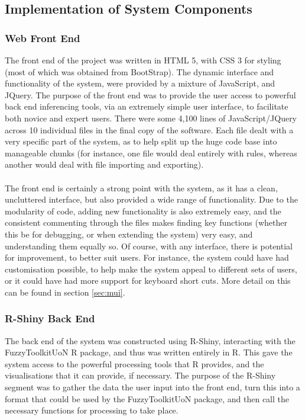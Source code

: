 \subsection{Implementation of System Components}
\tocless\subsubsection{Web Front End}
The front end of the project was written in HTML 5, with CSS 3 for styling (most of which was obtained from BootStrap). The dynamic interface and functionality of the system, were provided by a mixture of JavaScript, and JQuery. The purpose of the front end was to provide the user access to powerful back end inferencing tools, via an extremely simple user interface, to facilitate both novice and expert users. There were some 4,100 lines of JavaScript/JQuery across 10 individual files in the final copy of the software. Each file dealt with a very specific part of the system, as to help split up the huge code base into manageable chunks (for instance, one file would deal entirely with rules, whereas another would deal with file importing and exporting).\ \\
\ \\
The front end is certainly a strong point with the system, as it has a clean, uncluttered interface, but also provided a wide range of functionality. Due to the modularity of code, adding new functionality is also extremely easy, and the consistent commenting through the files makes finding key functions (whether this be for debugging, or when extending the system) very easy, and understanding them equally so. Of course, with any interface, there is potential for improvement, to better suit users. For instance, the system could have had customisation possible, to help make the system appeal to different sets of users, or it could have had more support for keyboard short cuts. More detail on this can be found in section \ref{sec:mui}.

\tocless\subsubsection{R-Shiny Back End}
The back end of the system was constructed using R-Shiny, interacting with the FuzzyToolkitUoN R package, and thus was written entirely in R. This gave the system access to the powerful processing tools that R provides, and the visualisations that it can provide, if necessary. The purpose of the R-Shiny segment was to gather the data the user input into the front end, turn this into a format that could be used by the FuzzyToolkitUoN package, and then call the necessary functions for processing to take place.

